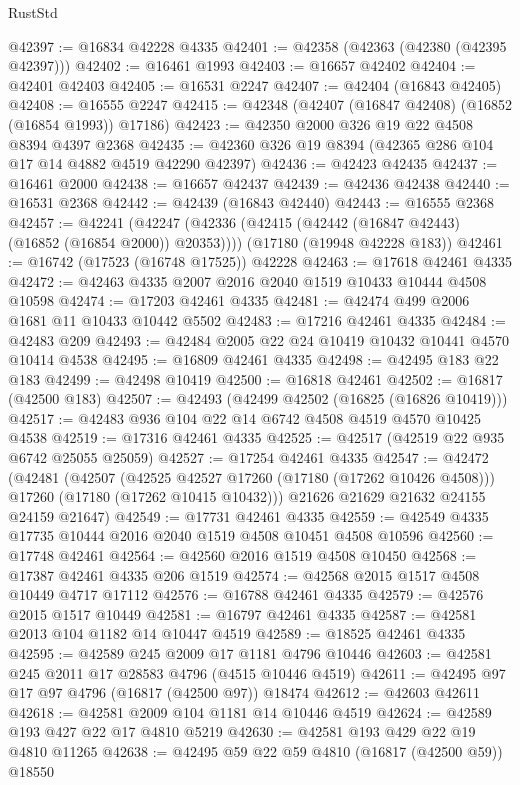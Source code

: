 \begin{lexlean}{RustStd}
\begin{coremodule}
@42397 := @16834 @42228 @4335
@42401 := @42358 (@42363 (@42380 (@42395 @42397)))
@42402 := @16461 @1993
@42403 := @16657 @42402
@42404 := @42401 @42403
@42405 := @16531 @2247
@42407 := @42404 (@16843 @42405)
@42408 := @16555 @2247
@42415 := @42348 (@42407 (@16847 @42408) (@16852 (@16854 @1993)) @17186)
@42423 := @42350 @2000 @326 @19 @22 @4508 @8394 @4397 @2368
@42435 := @42360 @326 @19 @8394 (@42365 @286 @104 @17 @14 @4882 @4519 @42290 @42397)
@42436 := @42423 @42435
@42437 := @16461 @2000
@42438 := @16657 @42437
@42439 := @42436 @42438
@42440 := @16531 @2368
@42442 := @42439 (@16843 @42440)
@42443 := @16555 @2368
@42457 := @42241
    (@42247 (@42336 (@42415 (@42442 (@16847 @42443) (@16852 (@16854 @2000)) @20353))))
    (@17180 (@19948 @42228 @183))
@42461 := @16742 (@17523 (@16748 @17525)) @42228
@42463 := @17618 @42461 @4335
@42472 := @42463 @4335 @2007 @2016 @2040 @1519 @10433 @10444 @4508 @10598
@42474 := @17203 @42461 @4335
@42481 := @42474 @499 @2006 @1681 @11 @10433 @10442 @5502
@42483 := @17216 @42461 @4335
@42484 := @42483 @209
@42493 := @42484 @2005 @22 @24 @10419 @10432 @10441 @4570 @10414 @4538
@42495 := @16809 @42461 @4335
@42498 := @42495 @183 @22 @183
@42499 := @42498 @10419
@42500 := @16818 @42461
@42502 := @16817 (@42500 @183)
@42507 := @42493 (@42499 @42502 (@16825 (@16826 @10419)))
@42517 := @42483 @936 @104 @22 @14 @6742 @4508 @4519 @4570 @10425 @4538
@42519 := @17316 @42461 @4335
@42525 := @42517 (@42519 @22 @935 @6742 @25055 @25059)
@42527 := @17254 @42461 @4335
@42547 := @42472
    (@42481
      (@42507
        (@42525 @42527 @17260 (@17180 (@17262 @10426 @4508)))
        @17260
        (@17180 (@17262 @10415 @10432)))
      @21626
      @21629
      @21632
      @24155
      @24159
      @21647)
@42549 := @17731 @42461 @4335
@42559 := @42549 @4335 @17735 @10444 @2016 @2040 @1519 @4508 @10451 @4508 @10596
@42560 := @17748 @42461
@42564 := @42560 @2016 @1519 @4508 @10450
@42568 := @17387 @42461 @4335 @206 @1519
@42574 := @42568 @2015 @1517 @4508 @10449 @4717 @17112
@42576 := @16788 @42461 @4335
@42579 := @42576 @2015 @1517 @10449
@42581 := @16797 @42461 @4335
@42587 := @42581 @2013 @104 @1182 @14 @10447 @4519
@42589 := @18525 @42461 @4335
@42595 := @42589 @245 @2009 @17 @1181 @4796 @10446
@42603 := @42581 @245 @2011 @17 @28583 @4796 (@4515 @10446 @4519)
@42611 := @42495 @97 @17 @97 @4796 (@16817 (@42500 @97)) @18474
@42612 := @42603 @42611
@42618 := @42581 @2009 @104 @1181 @14 @10446 @4519
@42624 := @42589 @193 @427 @22 @17 @4810 @5219
@42630 := @42581 @193 @429 @22 @19 @4810 @11265
@42638 := @42495 @59 @22 @59 @4810 (@16817 (@42500 @59)) @18550

\end{coremodule}
\end{lexlean}
